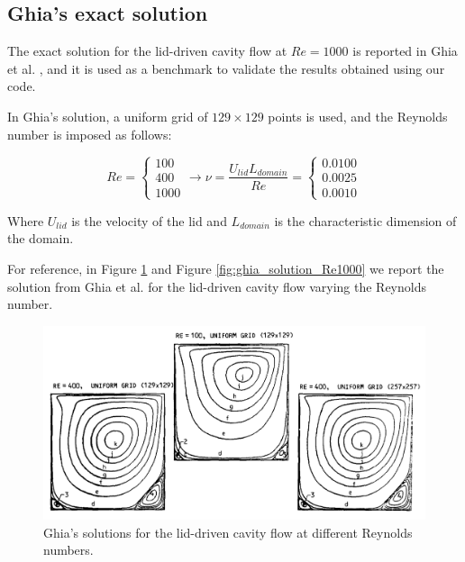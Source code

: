 \subsection{Ghia's exact solution}
\label{subsec:ghia_exact_solution}

The exact solution for the lid-driven cavity flow at $Re = 1000$ is reported in Ghia et al. \cite{Ghia1982HighReSF}, and it is used as a benchmark to validate the results obtained using our code.

In Ghia's solution, a uniform grid of $129 \times 129$ points is used, and the Reynolds number is imposed as follows:

\begin{equation}
    Re = \begin{cases}
        100 \\
        400 \\
        1000
    \end{cases}
    \rightarrow
    \nu = \frac{U_{lid} L_{domain}}{Re} = \begin{cases}
        0.0100 \\
        0.0025 \\
        0.0010
    \end{cases}
\end{equation}

Where $U_{lid}$ is the velocity of the lid and $L_{domain}$ is the characteristic dimension of the domain.

For reference, in Figure \ref{fig:ghia_solutions} and Figure \ref{fig:ghia_solution_Re1000} we report the solution from Ghia et al. \cite{Ghia1982HighReSF} for the lid-driven cavity flow varying the Reynolds number.

\begin{figure}[H]
    \centering
    \includegraphics[width=.9\textwidth]{./img/ghia_solutions}
    \caption{Ghia's solutions for the lid-driven cavity flow at different Reynolds numbers.}
    \label{fig:ghia_solutions}
\end{figure}

